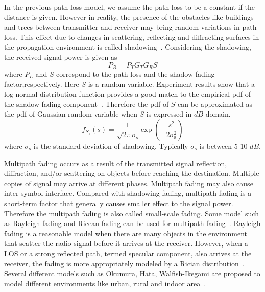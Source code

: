In the previous path loss model, we assume the path loss to be a constant if the distance is given. However in reality, the presence of the obstacles like buildings and trees between transmitter and receiver may bring random variations in path loss. This effect due to changes in scattering, reflecting and diffracting surfaces in the propagation environment is called shadowing~\cite{rappaport1996wireless}. Considering the shadowing, the received signal power is given as
\begin{equation}
P_{R} = P_{T} G_{T} G_{R} S
\end{equation}
where $P_{L}$ and $S$ correspond to the path loss and the shadow fading factor,respectively. Here $S$ is a random variable.
Experiment results show that a log-normal distribution function provides a good match to the empirical pdf of the shadow fading component~\cite{bertoni1999radio}. Therefore the pdf of $S$ can be approximated as the pdf of Gaussian random variable when $S$ is expressed in $dB$ domain.
\begin{equation} 
f_{S_{s}} (s)
= \frac{1}{\sqrt{2 \pi} \sigma_{\mathrm{s}}} 
\exp \left( - \frac{s^2}{2 \sigma_{\mathrm{s}}^2} \right)
\end{equation}
where $\sigma_{\mathrm{s}}$ is the standard deviation of shadowing. Typically $\sigma_{\mathrm{s}}$ is between 5-10 $dB$.

Multipath fading occurs as a result of the transmitted signal reflection, diffraction, and/or scattering on objects before reaching the destination. Multiple copies of signal may arrive at different phases. Multipath fading may also cause inter symbol interface. Compared with shadowing fading, multipath fading is a short-term factor that generally causes smaller effect to the signal power. Therefore the multipath fading is also called small-scale fading.
Some model such as Rayleigh fading and Ricean fading can be used for multipath fading~\cite{rappaport1996wireless}. Rayleigh fading is a reasonable model when there are many objects in the environment that scatter the radio signal before it arrives at the receiver. However, when a LOS or a strong
reflected path, termed specular component, also arrives at the receiver, the fading is more appropriately modeled by a Rician distribution~\cite{stuber2011principles}.
Several different models such as Okumura, Hata, Walfish-Ikegami are proposed to model different environments like urban, rural and indoor area~\cite{stuber2011principles}.



